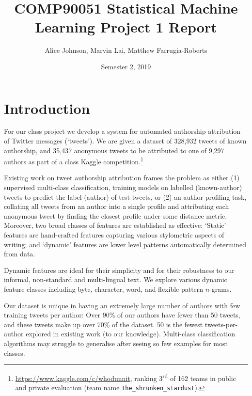 \documentclass[twocolumn,10pt]{article}
\title{COMP90051 Statistical Machine Learning Project 1 Report}
\author{
Alice Johnson,
Marvin Lai,
Matthew Farrugia-Roberts}
\date{Semester 2, 2019}
\begin{document}
\maketitle


\section{Introduction}
For our class project we develop a system for automated 
authorship attribution of Twitter messages (`tweets'). We
are given a dataset of 328,932 tweets of known authorship,
and 35,437 anonymous tweets to be attributed to one of
9,297 authors as part of a class Kaggle competition.\footnote{
\url{https://www.kaggle.com/c/whodunnit},
ranking 3\textsuperscript{rd} of 162 teams
in public and private evaluation
(team name {\tt the\_shrunken\_stardust}).}

Existing work on tweet authorship attribution\supercite{rocha2016authorship, bhargava2013stylometric, schwartz2013authorship}
frames the problem as either
(1) supervised multi-class classification, training models on
labelled (known-author) tweets to predict the label (author)
of test tweets, or
(2) an author profiling task, collating all tweets from an
author into a single profile and attributing each anonymous
tweet by finding the closest profile under some distance metric.
Moreover, two broad classes of features are established as
effective:
`Static' features are hand-crafted features capturing various
stylometric aspects of writing; and
`dynamic' features are lower level patterns automatically
determined from data.

Dynamic features are ideal for their simplicity and for their
robustness to our informal, non-standard and multi-lingual
text. We explore various dynamic feature classes including
byte, character, word, and flexible pattern $n$-grams.

Our dataset is unique in having an extremely large number
of authors with few training tweets per author:
Over 90\% of our authors have fewer than 50 tweets,
and these tweets make up over 70\% of the dataset.
50 is the fewest tweets-per-author explored in
existing work (to our knowledge).
Multi-class classification algorithms may struggle to
generalise after seeing so few examples for most classes.
\end{document}
